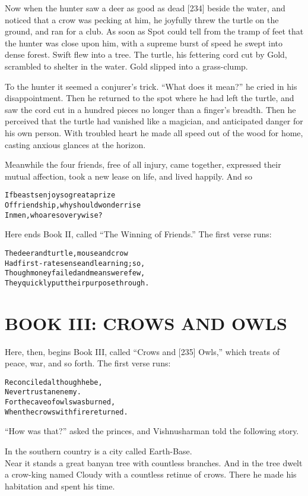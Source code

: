\documentclass{article}
\renewenvironment{verbatim}{\begin{alltt}\normalfont\begin{centering}}{\end{centering}\end{alltt}}
\begin{document}
Now when the hunter saw a deer as good as dead [234] beside the
water, and noticed that a crow was pecking at him, he joyfully
threw the turtle on the ground, and ran for a club. As soon as Spot
could tell from the tramp of feet that the hunter was close upon
him, with a supreme burst of speed he swept into dense forest.
Swift flew into a tree. The turtle, his fettering cord cut by Gold,
scrambled to shelter in the water. Gold slipped into a
grass-clump.

To the hunter it seemed a conjurer's trick. ``What does it mean?''
he cried in his disappointment. Then he returned to the spot where
he had left the turtle, and saw the cord cut in a hundred pieces no
longer than a finger's breadth. Then he perceived that the turtle
had vanished like a magician, and anticipated danger for his own
person. With troubled heart he made all speed out of the wood for
home, casting anxious glances at the horizon.

Meanwhile the four friends, free of all injury, came together,
expressed their mutual affection, took a new lease on life, and
lived happily. And so

\begin{verbatim}
If beasts enjoy so great a prize
Of friendship, why should wonder rise
In men, who are so very wise?                           
\end{verbatim}
Here ends Book II, called ``The Winning of Friends.'' The first
verse runs:

\begin{verbatim}
The deer and turtle, mouse and crow
Had first-rate sense and learning; so,
Though money failed and means were few,
They quickly put their purpose through.                 
\end{verbatim}
\section{BOOK III: CROWS AND OWLS}

Here, then, begins Book III, called ``Crows and [235] Owls,'' which
treats of peace, war, and so forth. The first verse runs:

\begin{verbatim}
Reconciled although he be,
Never trust an enemy.
For the cave of owls was burned,
When the crows with fire returned.
\end{verbatim}
``How was that?'' asked the princes, and Vishnusharman told the
following story.

In the southern country is a city called Earth-Base.\\Near it
stands a great banyan tree with countless branches. And in the tree
dwelt a crow-king named Cloudy with a countless retinue of crows.
There he made his habitation and spent his time.
\end{document}
